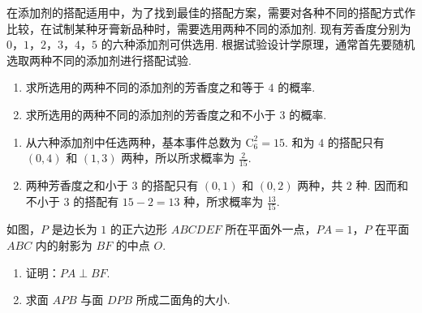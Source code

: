 \begin{problem}
在添加剂的搭配适用中，为了找到最佳的搭配方案，需要对各种不同的搭配方式作比较，在试制某种牙膏新品种时，需要选用两种不同的添加剂. 现有芳香度分别为 \(0\)，\(1\)，\(2\)，\(3\)，\(4\)，\(5\) 的六种添加剂可供选用. 根据试验设计学原理，通常首先要随机选取两种不同的添加剂进行搭配试验.

\begin{enumerate}
\item 求所选用的两种不同的添加剂的芳香度之和等于 \(4\) 的概率.
\item 求所选用的两种不同的添加剂的芳香度之和不小于 \(3\) 的概率.
\end{enumerate}
\end{problem}

\begin{solution}
\begin{enumerate}
\item 从六种添加剂中任选两种，基本事件总数为 \(\mathrm C_6^2=15\). 和为 \(4\) 的搭配只有 \((0,4)\) 和 \((1,3)\) 两种，所以所求概率为 \(\frac{2}{15}\).
\item 两种芳香度之和小于 \(3\) 的搭配只有 \((0,1)\) 和 \((0,2)\) 两种，共 \(2\) 种. 因而和不小于 \(3\) 的搭配有 \(15-2=13\) 种，所求概率为 \(\frac{13}{15}\).
\end{enumerate}
\end{solution}

\begin{problem}
如图，\(P\) 是边长为 \(1\) 的正六边形 \(ABCDEF\) 所在平面外一点，\(PA = 1\)，\(P\) 在平面 \(ABC\) 内的射影为 \(BF\) 的中点 \(O\).

\begin{enumerate}
\item 证明：\(PA \perp BF\).
\item 求面 \(APB\) 与面 \(DPB\) 所成二面角的大小.
\end{enumerate}

\end{problem}

